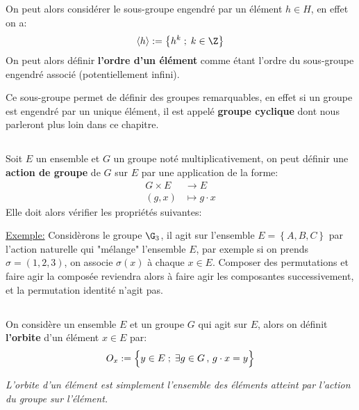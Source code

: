 On peut alors considérer le sous-groupe engendré par un élément \(h \in H\), en effet on a:
\[
   \langle h \rangle := \bigl\{ h^{k} \; ; \; k \in \Z \bigl\}
\]
On peut alors définir \textbf{l'ordre d'un élément} comme étant l'ordre du sous-groupe engendré associé (potentiellement infini).\<

Ce sous-groupe permet de définir des groupes remarquables, en effet si un groupe est engendré par un unique élément, il est appelé \textbf{groupe cyclique} dont nous parleront plus loin dans ce chapitre.
\pagebreak
\subsection*{}
Soit \(E\) un ensemble et \(G\) un groupe noté multiplicativement, on peut définir une \textbf{action de groupe} de \(G\) sur \(E\) par une application de la forme:
\[
   \begin{aligned}
      G \times E &\longrightarrow E\\
      (g, x) &\longmapsto g \cdot x
   \end{aligned}
\]
Elle doit alors vérifier les propriétés suivantes:

\underline{Exemple:} Considèrons le groupe \(\G_3\), il agit sur l'ensemble \(E = \left\{ A, B, C\right\}\) par l'action naturelle qui "mélange" l'ensemble \(E\), par exemple si on prends \(\sigma = (1, 2, 3)\), on associe \(\sigma(x)\) à chaque \(x \in E\).\+
Composer des permutations et faire agir la composée reviendra alors à faire agir les composantes successivement, et la permutation identité n'agit pas. 
\subsection*{}
On considère un ensemble \(E\) et un groupe \(G\) qui agit sur \(E\), alors on définit \textbf{l'orbite} d'un élément \(x \in E\) par:
\[
   O_x := \Bigl\{ y \in E \; ; \; \exists g \in G \, , \, g \cdot x = y\Bigl\}   
\]
\begin{center}
   \textit{L'orbite d'un élément est simplement l'ensemble des éléments atteint par l'action du groupe sur l'élément.}
\end{center}
